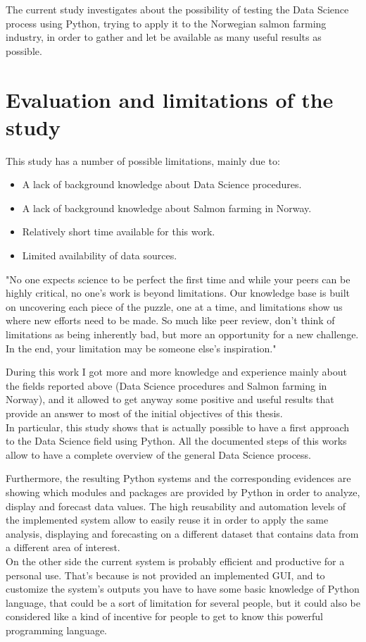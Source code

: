 
The current study investigates about the possibility of testing the Data Science process using Python, trying to apply it to the Norwegian salmon farming industry, in order to gather and let be available as many useful results as possible.

\section{Evaluation and limitations of the study}
\vspace{-5mm}
This study has a number of possible limitations, mainly due to:
\vspace{-5mm}
\begin{itemize}
 \setlength{\itemsep}{-5pt}
 \item A lack of background knowledge about Data Science procedures.
 \item A lack of background knowledge about Salmon farming in Norway.
 \item Relatively short time available for this work.
 \item Limited availability of data sources.
\end{itemize}

"No one expects science to be perfect the first time and while your peers can be highly critical, no one’s work is beyond limitations. Our knowledge base is built on uncovering each piece of the puzzle, one at a time, and limitations show us where new efforts need to be made. So much like peer review, don’t think of limitations as being inherently bad, but more an opportunity for a new challenge. In the end, your limitation may be someone else’s inspiration." \cite{limitations}
  
During this work I got more and more knowledge and experience mainly about the fields reported above (Data Science procedures and Salmon farming in Norway), and it allowed to get anyway some positive and useful results that provide an answer to most of the initial objectives of this thesis. \\
In particular, this study shows that is actually possible to have a first approach to the Data Science field using Python. All the documented steps of this works allow to have a complete overview of the general Data Science process.

Furthermore, the resulting Python systems and the corresponding evidences are showing which modules and packages are provided by Python in order to analyze, display and forecast data values. The high reusability and automation levels of the implemented system allow to easily reuse it in order to apply the same analysis, displaying and forecasting on a different dataset that contains data from a different area of interest. \\
On the other side the current system is probably efficient and productive for a personal use. That's because is not provided an implemented GUI, and to customize the system's outputs you have to have some basic knowledge of Python language, that could be a sort of limitation for several people, but it could also be considered like a kind of incentive for people to get to know this powerful programming language.

